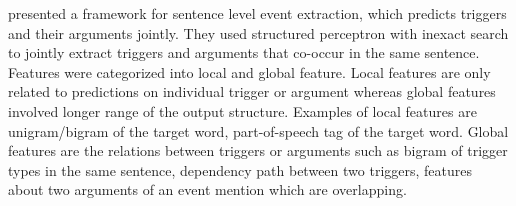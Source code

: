 \cite{li2013joint} presented a framework for sentence level event extraction, which predicts triggers and their arguments jointly. They used structured perceptron with inexact search to jointly extract triggers and arguments that co-occur in the same sentence. Features were categorized into local and global feature. Local features are only related to predictions on individual trigger or argument whereas global features involved longer range of the output structure. Examples of local features are unigram/bigram of the target word, part-of-speech tag of the target word. Global features are the relations between triggers or arguments such as bigram of trigger types in the same sentence, dependency path between two triggers, features about two arguments of an event mention which are overlapping.

